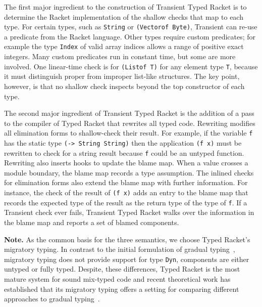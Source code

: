 The first major ingredient to the construction of Transient Typed Racket is to determine the
Racket implementation of the shallow checks that map to each type.  For
certain types, such as {\tt String} or {\tt (Vectorof Byte)}, Transient
can re-use a predicate from the Racket language.  Other types require custom
predicates; for example the type {\tt Index} of valid array indices allows
a range of positive exact integers.  Many custom predicates run in
constant time, but some are more involved.  One linear-time check is for
{\tt (Listof T)} for any element type {\tt T}, because it must distinguish
proper from improper list-like structures.  The
key point, however, is that no shallow check inspects beyond the top
constructor of each type.

The second major ingredient of Transient Typed Racket  is the addition of
a pass to the compiler of Typed Racket that rewrites all typed code.
Rewriting modifies all elimination forms to shallow-check their result.
For example, if the variable {\tt f} has the static type {\tt (-> String
String)} then the application {\tt (f x)} must be rewritten to check for a
string result because {\tt f} could be an untyped function.  Rewriting
also inserts hooks to update the blame map.  When a value crosses a module
boundary, the blame map records a type assumption.  The inlined checks
for elimination forms also extend the blame map with further information. For
instance, the check of the result of {\tt (f x)} adds an entry to the blame map
that records the expected type of the result as the return type of the type of
{\tt f}.  If a Transient check ever fails, Transient Typed Racket walks over 
the information in the blame map and reports a set of blamed components.

\smallskip
\noindent
{\bf Note.} As the common basis for the three semantics, we choose 
Typed Racket's migratory typing. In contrast to the initial formulation of
gradual typing~\cite{st-sfp-2006}, migratory typing does not provide
support for type \texttt{Dyn}, components are either untyped or fully
typed.
Despite, these differences, Typed Racket is the most
mature system for sound mix-typed code
and recent theoretical work has established that
its migratory typing offers a setting for comparing different approaches to gradual
typing~\cite{gf-icfp-2018,gfd-oopsla-2019}.
